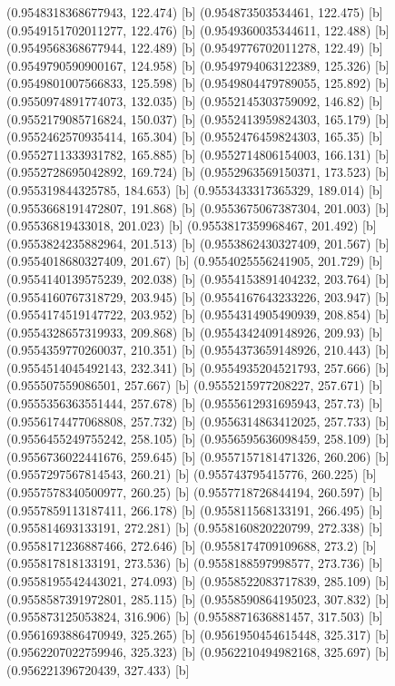 {{{(0.9548318368677943, 122.474) [b] 
(0.954873503534461, 122.475) [b] 
(0.9549151702011277, 122.476) [b] 
(0.9549360035344611, 122.488) [b] 
(0.9549568368677944, 122.489) [b] 
(0.9549776702011278, 122.49) [b] 
(0.9549790590900167, 124.958) [b] 
(0.9549794063122389, 125.326) [b] 
(0.9549801007566833, 125.598) [b] 
(0.9549804479789055, 125.892) [b] 
(0.9550974891774073, 132.035) [b] 
(0.9552145303759092, 146.82) [b] 
(0.9552179085716824, 150.037) [b] 
(0.9552413959824303, 165.179) [b] 
(0.9552462570935414, 165.304) [b] 
(0.9552476459824303, 165.35) [b] 
(0.9552711333931782, 165.885) [b] 
(0.9552714806154003, 166.131) [b] 
(0.9552728695042892, 169.724) [b] 
(0.9552963569150371, 173.523) [b] 
(0.955319844325785, 184.653) [b] 
(0.9553433317365329, 189.014) [b] 
(0.9553668191472807, 191.868) [b] 
(0.9553675067387304, 201.003) [b] 
(0.95536819433018, 201.023) [b] 
(0.9553817359968467, 201.492) [b] 
(0.9553824235882964, 201.513) [b] 
(0.9553862430327409, 201.567) [b] 
(0.9554018680327409, 201.67) [b] 
(0.9554025556241905, 201.729) [b] 
(0.9554140139575239, 202.038) [b] 
(0.9554153891404232, 203.764) [b] 
(0.9554160767318729, 203.945) [b] 
(0.9554167643233226, 203.947) [b] 
(0.9554174519147722, 203.952) [b] 
(0.9554314905490939, 208.854) [b] 
(0.9554328657319933, 209.868) [b] 
(0.9554342409148926, 209.93) [b] 
(0.9554359770260037, 210.351) [b] 
(0.9554373659148926, 210.443) [b] 
(0.9554514045492143, 232.341) [b] 
(0.9554935204521793, 257.666) [b] 
(0.955507559086501, 257.667) [b] 
(0.9555215977208227, 257.671) [b] 
(0.9555356363551444, 257.678) [b] 
(0.9555612931695943, 257.73) [b] 
(0.9556174477068808, 257.732) [b] 
(0.9556314863412025, 257.733) [b] 
(0.9556455249755242, 258.105) [b] 
(0.9556595636098459, 258.109) [b] 
(0.9556736022441676, 259.645) [b] 
(0.9557157181471326, 260.206) [b] 
(0.9557297567814543, 260.21) [b] 
(0.955743795415776, 260.225) [b] 
(0.9557578340500977, 260.25) [b] 
(0.9557718726844194, 260.597) [b] 
(0.9557859113187411, 266.178) [b] 
(0.955811568133191, 266.495) [b] 
(0.955814693133191, 272.281) [b] 
(0.9558160820220799, 272.338) [b] 
(0.9558171236887466, 272.646) [b] 
(0.9558174709109688, 273.2) [b] 
(0.955817818133191, 273.536) [b] 
(0.9558188597998577, 273.736) [b] 
(0.9558195542443021, 274.093) [b] 
(0.9558522083717839, 285.109) [b] 
(0.9558587391972801, 285.115) [b] 
(0.9558590864195023, 307.832) [b] 
(0.955873125053824, 316.906) [b] 
(0.9558871636881457, 317.503) [b] 
(0.9561693886470949, 325.265) [b] 
(0.9561950454615448, 325.317) [b] 
(0.9562207022759946, 325.323) [b] 
(0.9562210494982168, 325.697) [b] 
(0.956221396720439, 327.433) [b] 
}}}
